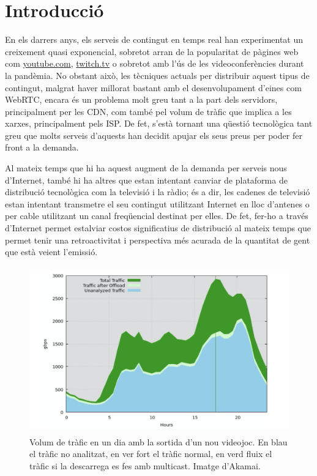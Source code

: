 \section{Introducció}

{
    En els darrers anys, els serveis de contingut en temps real han experimentat un creixement quasi exponencial, sobretot arran de la
    popularitat de pàgines web com \url{youtube.com}, \url{twitch.tv} o sobretot amb l'ús de les videoconferències durant la pandèmia.
    No obstant això, les tècniques actuals per distribuir aquest tipus de contingut, malgrat haver millorat bastant amb el desenvolupament
    d'eines com \ac{WebRTC}, encara és un problema molt greu tant a la part dels servidors, principalment per les \ac{CDN}, com també pel
    volum de tràfic que implica a les xarxes, principalment pels \ac{ISP}. De fet, s'està tornant una qüestió tecnològica tant greu que molts
    serveis d'aquests han decidit apujar els seus preus per poder fer front a la demanda.

    Al mateix temps que hi ha aquest augment de la demanda per serveis nous d'Internet, també hi ha altres que estan intentant canviar
    de plataforma de distribució tecnològica com la televisió i la ràdio; és a dir, les cadenes de televisió estan intentant transmetre el seu contingut utilitzant Internet en lloc d'antenes o per cable utilitzant un canal freqüencial destinat per elles. De fet, fer-ho a través
    d'Internet permet estalviar costos significatius de distribució al mateix temps que permet tenir una retroactivitat i perspectiva més acurada
    de la quantitat de gent que està veient l'emissió.

    \begin{figure}[H]
        \label{fig:trafic_desglosat}
        \centering
        \includegraphics[width=15cm, height=7.2cm]{img/01_introduccio/trafic_peak.png}
        \caption[Trafic d'Internet]{\footnotesize{Volum de tràfic en un dia amb la sortida d'un nou videojoc. En blau el tràfic no analitzat,
        en ver fort el tràfic normal, en verd fluix el tràfic si la descarrega es fes amb multicast. Imatge d'Akamai.}}
    \end{figure}

}
